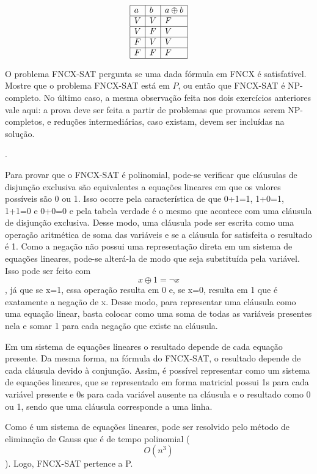 \documentclass[12pt]{article}
\newcommand{\resposta}[1]{ \noindent {\bf Solução}.{\color{blue} #1}}
\begin{document}
\begin{enumerate}
  $$\begin{array}{|l|l|l|}\hline
      a & b & a \oplus b \\ \hline
      V & V & F \\ \hline
      V & F & V \\ \hline
      F & V & V \\ \hline
      F & F & F \\ \hline
  \end{array}$$

  O problema FNCX-SAT pergunta se uma dada fórmula em FNCX é
  satisfatível. Mostre que o problema FNCX-SAT está em $P$, ou então
  que FNCX-SAT é NP-completo. No último caso, a mesma observação feita
  nos dois exercícios anteriores vale aqui: a prova deve ser feita a
  partir de problemas que provamos serem NP-completos, e reduções
  intermediárias, caso existam, devem ser incluídas na solução.

  \resposta{
    Para provar que o FNCX-SAT é polinomial, pode-se verificar que cláusulas de disjunção exclusiva são equivalentes a equações lineares em que os valores possíveis são 0 ou 1. Isso ocorre pela característica de que 0+1=1, 1+0=1, 1+1=0 e 0+0=0 e pela tabela verdade é o mesmo que acontece com uma cláusula de disjunção exclusiva. Desse modo, uma cláusula pode ser escrita como uma operação aritmética de soma das variáveis e se a cláusula for satisfeita o resultado é 1. Como a negação não possui uma representação direta em um sistema de equações lineares, pode-se alterá-la de modo que seja substituída pela variável. Isso pode ser feito com $$ x \oplus 
1 = \neg x$$, já que se x=1, essa operação resulta em 0 e, se x=0, resulta em 1 que é exatamente a negação de x. Desse modo, para representar uma cláusula como uma equação linear, basta colocar como uma soma de todas as variáveis presentes nela e somar 1 para cada negação que existe na cláusula.

	Em um sistema de equações lineares o resultado depende de cada equação presente. Da mesma forma, na fórmula do FNCX-SAT, o resultado depende de cada cláusula devido à conjunção. Assim, é possível representar como um sistema de equações lineares, que se representado em forma matricial possui 1s para cada variável presente e 0s para cada variável ausente na cláusula e o resultado como 0 ou 1, sendo que uma cláusula corresponde a uma linha.

	Como é um sistema de equações lineares, pode ser resolvido pelo método de eliminação de Gauss que é de tempo polinomial ($$O(n^3)$$). Logo, FNCX-SAT pertence a P.
}
\end{enumerate}
\end{document}

